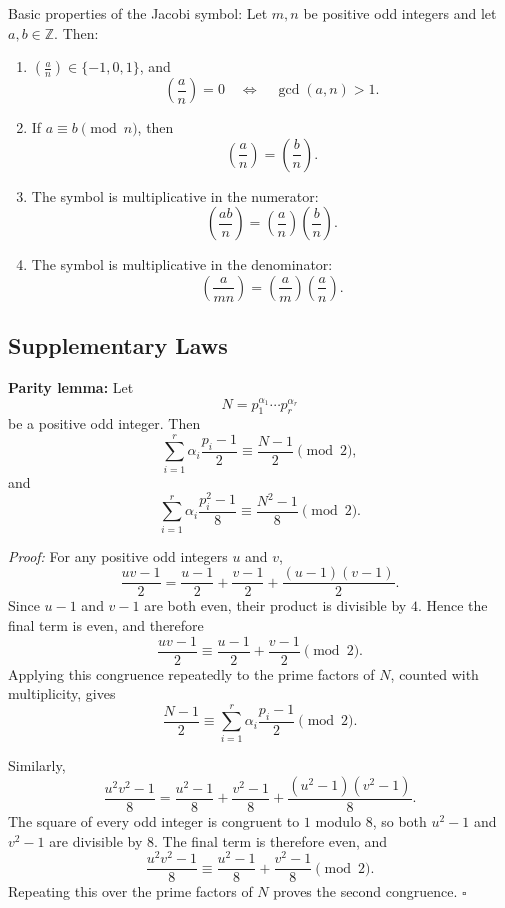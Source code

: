 \documentclass[a4paper,11pt,abstracton]{scrartcl}
\theoremstyle{dotlessP}
\theoremstyle{dotlessS}
\theoremstyle{remark}
\theoremstyle{definition}
\begin{document}
\begin{mainbox}{Basic properties of the Jacobi symbol:}
Let $m,n$ be positive odd integers and let $a,b\in\mathbb{Z}$. Then:
\begin{enumerate}
    \item $\left(\frac an\right)\in\{-1,0,1\}$, and
    \[
        \left(\frac an\right)=0
          \quad\Longleftrightarrow\quad \gcd(a,n)>1.
    \]
    \item If $a\equiv b\pmod n$, then
    \[
        \left(\frac an\right)=\left(\frac bn\right).
    \]
    \item The symbol is multiplicative in the numerator:
    \[
        \left(\frac{ab}{n}\right)
          =\left(\frac an\right)\left(\frac bn\right).
    \]
    \item The symbol is multiplicative in the denominator:
    \[
        \left(\frac{a}{mn}\right)
          =\left(\frac am\right)\left(\frac an\right).
    \]
\end{enumerate}
\end{mainbox}

\subsection{Supplementary Laws}

\begin{remark_box}
\textbf{Parity lemma:}
Let
\[
    N=p_1^{\alpha_1}\cdots p_r^{\alpha_r}
\]
be a positive odd integer. Then
\[
    \sum_{i=1}^{r}\alpha_i\frac{p_i-1}{2}
      \equiv\frac{N-1}{2}\pmod2,
\]
and
\[
    \sum_{i=1}^{r}\alpha_i\frac{p_i^2-1}{8}
      \equiv\frac{N^2-1}{8}\pmod2.
\]
\end{remark_box}

\begin{claim_box}
\textit{Proof:}
For any positive odd integers $u$ and $v$,
\[
    \frac{uv-1}{2}
      =\frac{u-1}{2}+\frac{v-1}{2}
       +\frac{(u-1)(v-1)}{2}.
\]
Since $u-1$ and $v-1$ are both even, their product is divisible by
$4$. Hence the final term is even, and therefore
\[
    \frac{uv-1}{2}
      \equiv\frac{u-1}{2}+\frac{v-1}{2}\pmod2.
\]
Applying this congruence repeatedly to the prime factors of $N$,
counted with multiplicity, gives
\[
    \frac{N-1}{2}
      \equiv\sum_{i=1}^{r}\alpha_i\frac{p_i-1}{2} \pmod2.
\]

Similarly,
\[
    \frac{u^2v^2-1}{8}
      =\frac{u^2-1}{8}+\frac{v^2-1}{8}
       +\frac{(u^2-1)(v^2-1)}{8}.
\]
The square of every odd integer is congruent to $1$ modulo $8$, so
both $u^2-1$ and $v^2-1$ are divisible by $8$. The final term is
therefore even, and
\[
    \frac{u^2v^2-1}{8}
      \equiv\frac{u^2-1}{8}+\frac{v^2-1}{8}\pmod2.
\]
Repeating this over the prime factors of $N$ proves the second
congruence.
\hfill$\square$
\end{claim_box}
\end{document}
